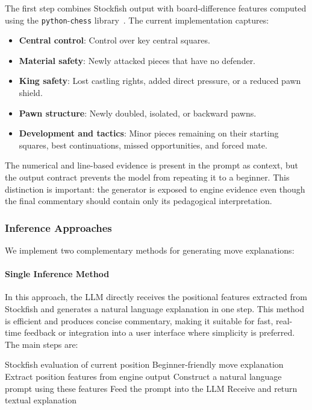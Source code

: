 \documentclass[sigconf,nonacm]{acmart}
\begin{document}
The first step combines Stockfish output with board-difference features computed using the \texttt{python}-\texttt{chess} library~\cite{pythonchess}. The current implementation captures:

\begin{itemize}
    \item \textbf{Central control}: Control over key central squares.
    \item \textbf{Material safety}: Newly attacked pieces that have no defender.
    \item \textbf{King safety}: Lost castling rights, added direct pressure, or a reduced pawn shield.
    \item \textbf{Pawn structure}: Newly doubled, isolated, or backward pawns.
    \item \textbf{Development and tactics}: Minor pieces remaining on their starting squares, best continuations, missed opportunities, and forced mate.
\end{itemize}

The numerical and line-based evidence is present in the prompt as context, but the output contract prevents the model from repeating it to a beginner. This distinction is important: the generator is exposed to engine evidence even though the final commentary should contain only its pedagogical interpretation.

\subsubsection{Inference Approaches}

We implement two complementary methods for generating move explanations:

\paragraph{Single Inference Method} In this approach, the LLM directly receives the positional features extracted from Stockfish and generates a natural language explanation in one step. This method is efficient and produces concise commentary, making it suitable for fast, real-time feedback or integration into a user interface where simplicity is preferred. The main steps are:

\begin{algorithm}[H]
\caption{Single Inference Method (Abstract)}
\begin{algorithmic}[1]
\Require Stockfish evaluation of current position
\Ensure Beginner-friendly move explanation
\State Extract position features from engine output
\State Construct a natural language prompt using these features
\State Feed the prompt into the LLM
\State Receive and return textual explanation
\end{algorithmic}
\end{algorithm}
\end{document}
